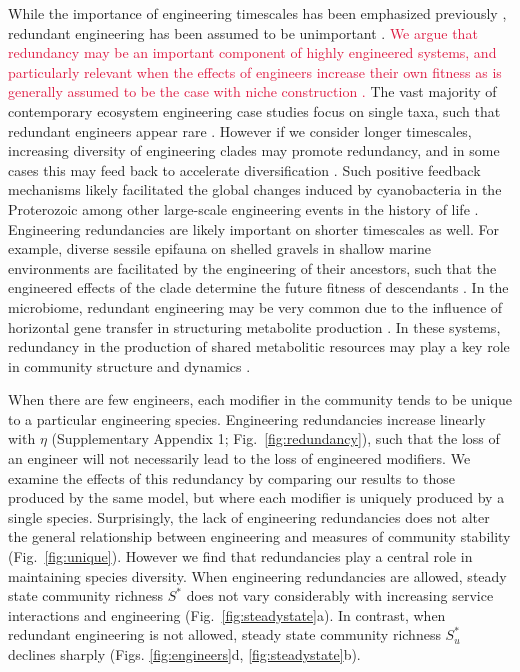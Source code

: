 \documentclass[twocolumn,preprintnumbers,amsmath,amssymb,superscriptaddress,linenumbers]{revtex4-1}
\newcommand{\rev}[1]{\textcolor{crimson}{#1}}
\begin{document}
While the importance of engineering timescales has been emphasized previously \cite{Hastings2007}, redundant engineering has been assumed to be unimportant \cite{Lawton1994}.
\rev{We argue that redundancy may be an important component of highly engineered systems, and particularly relevant when the effects of engineers increase their own fitness \cite{Cuddington2004} as is generally assumed to be the case with niche construction \cite{Krakauer2009}.}
The vast majority of contemporary ecosystem engineering case studies focus on single taxa, such that redundant engineers appear rare \cite{Lawton1994}.
However if we consider longer timescales, increasing diversity of engineering clades may promote redundancy, and in some cases this may feed back to accelerate diversification \cite{OdlingSmee2013b}.
Such positive feedback mechanisms likely facilitated the global changes induced by cyanobacteria in the Proterozoic \cite{Erwin2008,Schirrmeister2013} among other large-scale engineering events in the history of life \cite{Erwin2008}.
Engineering redundancies are likely important on shorter timescales as well.
For example, diverse sessile epifauna on shelled gravels in shallow marine environments are facilitated by the engineering of their ancestors, such that the engineered effects of the clade determine the future fitness of descendants \cite{Kidwell1986}.
In the microbiome, redundant engineering may be very common due to the influence of horizontal gene transfer in structuring metabolite production \cite{Polz2013}.
In these systems, redundancy in the production of shared metabolitic resources may play a key role in community structure and dynamics \cite{Kallus2017,Butler2018}.




When there are few engineers, each modifier in the community tends to be unique to a particular engineering species.
Engineering redundancies increase linearly with $\eta$ (Supplementary Appendix 1; Fig.\ \ref{fig:redundancy}), such that the loss of an engineer will not necessarily lead to the loss of engineered modifiers. %
We examine the effects of this redundancy by comparing our results to those produced by the same model, but where each modifier is uniquely produced by a single species.
Surprisingly, the lack of engineering redundancies does not alter the general relationship between engineering and measures of community stability (Fig.\ \ref{fig:unique}).
However we find that redundancies play a central role in maintaining species diversity.
When engineering redundancies are allowed, steady state community richness $S^*$ does not vary considerably with increasing service interactions and engineering (Fig.\ \ref{fig:steadystate}a).
In contrast, when redundant engineering is not allowed, steady state community richness $S^*_u$ declines sharply (Figs. \ref{fig:engineers}d, \ref{fig:steadystate}b).
\end{document}

